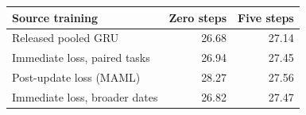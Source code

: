 \begin{tabular}{lrr}\toprule
Source training & Zero steps & Five steps \\\midrule
Released pooled GRU & 26.68 & 27.14 \\
Immediate loss, paired tasks & 26.94 & 27.45 \\
Post-update loss (MAML) & 28.27 & 27.56 \\
Immediate loss, broader dates & 26.82 & 27.47 \\
\bottomrule
\end{tabular}
